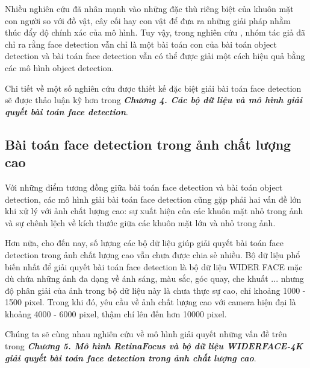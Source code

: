 {    \noindent
    Nhiều nghiên cứu đã nhân mạnh vào những đặc thù riêng biệt của khuôn mặt con người so với đồ vật, cây cối hay con vật để đưa ra những giải pháp nhằm thúc đẩy độ chính xác của mô hình.
    Tuy vậy, trong nghiên cứu \cite{zhu2020tinaface}, nhóm tác giả đã chỉ ra rằng face detection vẫn chỉ là một bài toán con của bài toán object detection và bài toán face detection vẫn có thể được giải một cách hiệu quả bằng các mô hình object detection.

    \noindent
    Chi tiết về một số nghiên cứu được thiết kế đặc biệt giải bài toán face detection sẽ được thảo luận kỹ hơn trong \textbf{\textit{Chương 4. Các bộ dữ liệu và mô hình giải quyết bài toán face detection}}.
    
    \subsection{Bài toán face detection trong ảnh chất lượng cao}
    Với những điểm tương đồng giữa bài toán face detection và bài toán object detection, các mô hình giải bài toán face detection cũng gặp phải hai vấn đề lớn khi xử lý với ảnh chất lượng cao: sự xuất hiện của các khuôn mặt nhỏ trong ảnh và sự chênh lệch về kích thước giữa các khuôn mặt lớn và nhỏ trong ảnh.

    \noindent
    Hơn nữa, cho đến nay, số lượng các bộ dữ liệu giúp giải quyết bài toán face detection trong ảnh chất lượng cao vẫn chưa được chia sẻ nhiều.
    Bộ dữ liệu phổ biến nhất để giải quyết bài toán face detection là bộ dữ liệu WIDER FACE \cite{yang2016wider} mặc dù chứa những ảnh đa dạng về ánh sáng, màu sắc, góc quay, che khuất ... nhưng độ phân giải của ảnh trong bộ dữ liệu này là chưa thực sự cao, chỉ khoảng 1000 - 1500 pixel.
    Trong khi đó, yêu cầu về ảnh chất lượng cao với camera hiện đại là khoảng 4000 - 6000 pixel, thậm chí lên đến hơn 10000 pixel.

    \noindent
    Chúng ta sẽ cùng nhau nghiên cứu về mô hình giải quyết những vấn đề trên trong \textbf{\textit{Chương 5. Mô hình RetinaFocus và bộ dữ liệu WIDERFACE-4K giải quyết bài toán face detection trong ảnh chất lượng cao}}.
}